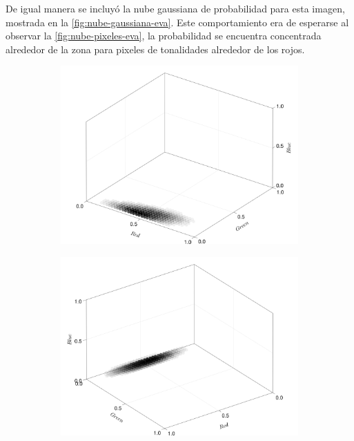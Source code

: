 De igual manera se incluyó la nube gaussiana de probabilidad para esta imagen, mostrada en la \cref{fig:nube-gaussiana-eva}. Este comportamiento era de esperarse al observar la \cref{fig:nube-pixeles-eva}, la probabilidad se encuentra concentrada alrededor de la zona para pixeles de tonalidades alrededor de los rojos.
\begin{figure}[ht!]
    \centering
    \begin{subfigure}[c]{0.3\textwidth}
        \centering
        \includegraphics[scale=0.09]{../figures/gaussian_cloud_eva_1}
    \end{subfigure}
    \begin{subfigure}[c]{0.3\textwidth}
        \centering
        \includegraphics[scale=0.09]{../figures/gaussian_cloud_eva_2}

\end{subfigure}
\end{figure}

